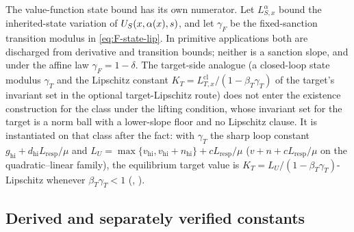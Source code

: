 The value-function state bound has its own numerator. Let
$L_{S,x}^{\alpha}$ bound the inherited-state variation of
$U_S(x,\alpha(x),s)$, and let $\gamma_F$ be the fixed-sanction transition
modulus in \eqref{eq:F-state-lip}. In primitive applications both are
discharged from derivative and transition bounds; neither is a sanction
slope, and under the affine law $\gamma_F=1-\delta$. The target-side
analogue (a closed-loop state modulus $\gamma_T$ and the Lipschitz
constant $K_T=L_{T,x}^{\mathrm{cl}}/(1-\beta_T\gamma_T)$ of the target's invariant set in the optional
target-Lipschitz route) does not enter the existence construction for the class under
the lifting condition, whose invariant set for the target is a norm ball with a lower-slope floor and
no Lipschitz clause. It is instantiated on that
class after the fact: with $\gamma_T$ the sharp loop constant
$g_{\mathrm{hi}}+d_{\mathrm{hi}}L_{\mathrm{resp}}/\mu$ and
$L_U=\max\{v_{\mathrm{hi}},v_{\mathrm{hi}}+n_{\mathrm{hi}}\}+cL_{\mathrm{resp}}/\mu$
($v+n+cL_{\mathrm{resp}}/\mu$ on the quadratic--linear family), the equilibrium target value is
$K_T=L_U/(1-\beta_T\gamma_T)$-Lipschitz whenever $\beta_T\gamma_T<1$
(, ).

\subsection{Derived and separately verified constants}

